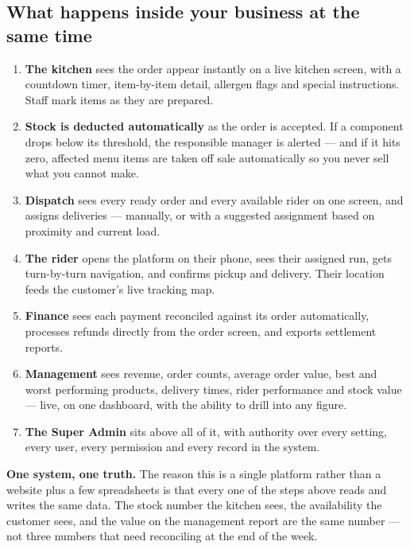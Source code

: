 \documentclass[11pt,a4paper]{article}
\begin{document}
\subsection{What happens inside your business at the same time}

\begin{enumerate}[leftmargin=17pt]
\item \textbf{The kitchen} sees the order appear instantly on a live kitchen screen, with
a countdown timer, item-by-item detail, allergen flags and special instructions. Staff
mark items as they are prepared.
\item \textbf{Stock is deducted automatically} as the order is accepted. If a component
drops below its threshold, the responsible manager is alerted --- and if it hits zero,
affected menu items are taken off sale automatically so you never sell what you cannot make.
\item \textbf{Dispatch} sees every ready order and every available rider on one screen,
and assigns deliveries --- manually, or with a suggested assignment based on proximity
and current load.
\item \textbf{The rider} opens the platform on their phone, sees their assigned run,
gets turn-by-turn navigation, and confirms pickup and delivery. Their location feeds the
customer's live tracking map.
\item \textbf{Finance} sees each payment reconciled against its order automatically,
processes refunds directly from the order screen, and exports settlement reports.
\item \textbf{Management} sees revenue, order counts, average order value, best and worst
performing products, delivery times, rider performance and stock value --- live, on one
dashboard, with the ability to drill into any figure.
\item \textbf{The Super Admin} sits above all of it, with authority over every setting,
every user, every permission and every record in the system.
\end{enumerate}

\begin{keybox}
\textbf{One system, one truth.} The reason this is a single platform rather than a
website plus a few spreadsheets is that every one of the steps above reads and writes the
same data. The stock number the kitchen sees, the availability the customer sees, and the
value on the management report are the same number --- not three numbers that need
reconciling at the end of the week.
\end{keybox}
\end{document}
